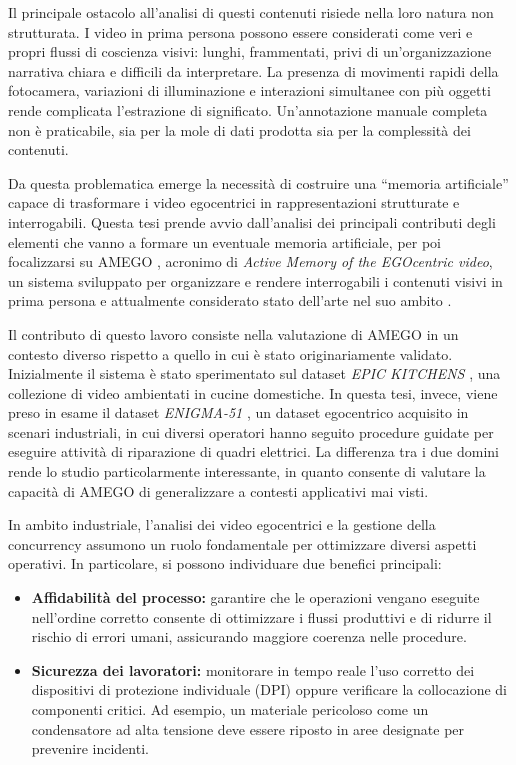 Il principale ostacolo all'analisi di questi contenuti risiede nella loro natura non strutturata. I video in prima persona possono essere considerati come veri e propri flussi di coscienza visivi: lunghi, frammentati, privi di un'organizzazione narrativa chiara e difficili da interpretare. La presenza di movimenti rapidi della fotocamera, variazioni di illuminazione e interazioni simultanee con più oggetti rende complicata l'estrazione di significato. Un'annotazione manuale completa non è praticabile, sia per la mole di dati prodotta sia per la complessità dei contenuti.

Da questa problematica emerge la necessità di costruire una “memoria artificiale” capace di trasformare i video egocentrici in rappresentazioni strutturate e interrogabili. Questa tesi prende avvio dall'analisi dei principali contributi degli elementi che vanno a formare un eventuale memoria artificiale, per poi focalizzarsi su AMEGO \cite{goletto2024amego}, acronimo di \emph{Active Memory of the EGOcentric video}, un sistema sviluppato per organizzare e rendere interrogabili i contenuti visivi in prima persona e attualmente considerato stato dell'arte nel suo ambito \cite{goletto2024amego}.

Il contributo di questo lavoro consiste nella valutazione di AMEGO in un contesto diverso rispetto a quello in cui è stato originariamente validato. Inizialmente il sistema è stato sperimentato sul dataset \emph{ EPIC KITCHENS }\cite{Damen2021PAMI}, una collezione di video ambientati in cucine domestiche. In questa tesi, invece, viene preso in esame il dataset \emph{ENIGMA-51} \cite{ragusa2023enigma51}, un dataset egocentrico acquisito in scenari industriali, in cui diversi operatori hanno seguito procedure guidate per eseguire attività di riparazione di quadri elettrici. La differenza tra i due domini rende lo studio particolarmente interessante, in quanto consente di valutare la capacità di AMEGO di generalizzare a contesti applicativi mai visti.

In ambito industriale, l'analisi dei video egocentrici e la gestione della concurrency assumono un ruolo fondamentale per ottimizzare diversi aspetti operativi. In particolare, si possono individuare due benefici principali:
\begin{itemize}
    \item \textbf{Affidabilità del processo:} garantire che le operazioni vengano eseguite nell'ordine corretto consente di ottimizzare i flussi produttivi e di ridurre il rischio di errori umani, assicurando maggiore coerenza nelle procedure.
    \item \textbf{Sicurezza dei lavoratori:} monitorare in tempo reale l'uso corretto dei dispositivi di protezione individuale (DPI) oppure verificare la collocazione di componenti critici. Ad esempio, un materiale pericoloso come un condensatore ad alta tensione deve essere riposto in aree designate per prevenire incidenti.
\end{itemize}

